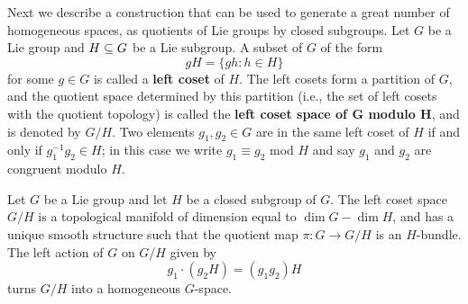 Next we describe a construction that can be used to generate a great number of homogeneous spaces, as quotients of Lie groups by closed subgroups. Let $G$ be a Lie group and $H\subseteq G$ be a Lie subgroup. A subset of $G$ of the form
\[gH=\{gh:h\in H\}\]
for some $g\in G$ is called a \textbf{left coset} of $H$. The left cosets form a partition of $G$, and the quotient space determined by this partition (i.e., the set of left cosets with the quotient topology) is called the \textbf{left coset space of $\bm{G}$ modulo $\bm{H}$}, and is denoted by $G/H$. Two elements $g_1,g_2\in G$ are in the same left coset of $H$ if and only if $g_1^{-1}g_2\in H$; in this case we write $g_1\equiv g_2$ mod $H$ and say $g_1$ and $g_2$ are congruent modulo $H$.
\begin{theorem}\label{homogenerous construct}
Let $G$ be a Lie group and let $H$ be a closed subgroup of $G$. The left coset space $G/H$ is a topological manifold of dimension equal to $\dim G-\dim H$, and has a unique smooth structure such that the quotient map $\pi:G\to G/H$ is an $H$-bundle. The left action of $G$ on $G/H$ given by
\[g_1\cdot(g_2H)=(g_1g_2)H\]
turns $G/H$ into a homogeneous $G$-space.
\end{theorem}
